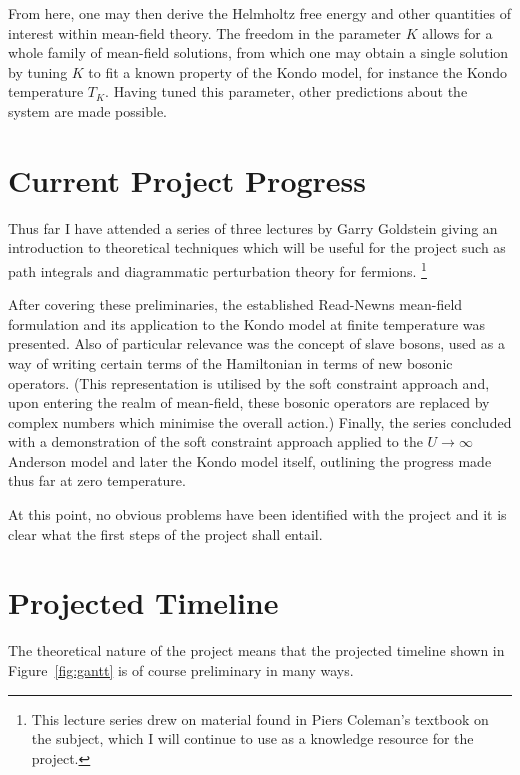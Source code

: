 \documentclass[12pt]{article}
\begin{document}
From here, one may then derive the Helmholtz free energy and other quantities of interest within mean-field theory. The freedom in the parameter $ K $ allows for a whole family of mean-field solutions, from which one may obtain a single solution by tuning $ K $ to fit a known property of the Kondo model, for instance the Kondo temperature $ T_K $. Having tuned this parameter, other predictions about the system are made possible.

\section{Current Project Progress}

Thus far I have attended a series of three lectures by Garry Goldstein giving an introduction to theoretical techniques which will be useful for the project such as path integrals and diagrammatic perturbation theory for fermions. \footnote{This lecture series drew on material found in Piers Coleman's textbook on the subject, which I will continue to use as a knowledge resource for the project.}

After covering these preliminaries, the established Read-Newns \cite{ReadNewns} mean-field formulation and its application to the Kondo model at finite temperature was presented. Also of particular relevance was the concept of slave bosons, used as a way of writing certain terms of the Hamiltonian in terms of new bosonic operators. (This representation is utilised by the soft constraint approach and, upon entering the realm of mean-field, these bosonic operators are replaced by complex numbers which minimise the overall action.) Finally, the series concluded with a demonstration of the soft constraint approach applied to the $ U \rightarrow \infty $ Anderson model and later the Kondo model itself, outlining the progress made thus far at zero temperature.

At this point, no obvious problems have been identified with the project and it is clear what the first steps of the project shall entail.

\section{Projected Timeline}

The theoretical nature of the project means that the projected timeline shown in Figure~\ref{fig:gantt} is of course preliminary in many ways.
\end{document}
